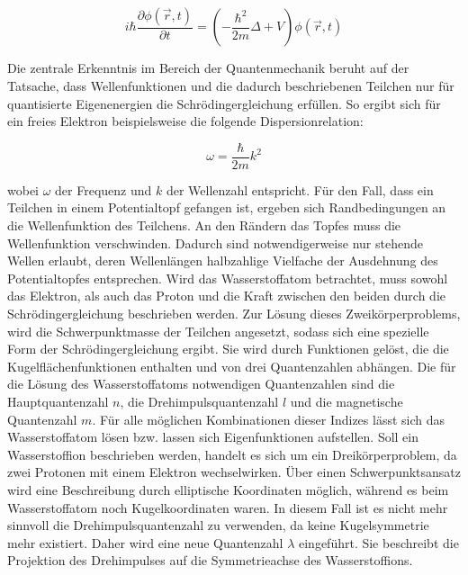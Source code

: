 \begin{equation}
    i \hbar \frac{\partial \phi(\vec{r},t)}{\partial t} = ( - \frac{\hbar^2}{2m} \Delta + V) \phi(\vec{r},t)
    \label{schroed}
\end{equation}

Die zentrale Erkenntnis im Bereich der Quantenmechanik beruht 
auf  der Tatsache, dass Wellenfunktionen und die dadurch beschriebenen Teilchen nur für 
quantisierte Eigenenergien die Schrödingergleichung erfüllen.
So ergibt sich für ein freies Elektron beispielsweise die folgende Dispersionrelation:

\begin{equation}
    \omega = \frac{\hbar}{2m}k^2
    \label{dispel}
\end{equation}

wobei $\omega$ der Frequenz und $k$ der Wellenzahl entspricht.
Für den Fall, dass ein Teilchen in einem Potentialtopf gefangen ist, ergeben sich
Randbedingungen an die Wellenfunktion des Teilchens. An den Rändern das Topfes muss die 
Wellenfunktion verschwinden. Dadurch sind notwendigerweise nur stehende Wellen erlaubt, 
deren Wellenlängen halbzahlige Vielfache der Ausdehnung des Potentialtopfes entsprechen.
Wird das Wasserstoffatom betrachtet, muss sowohl das Elektron, als auch das Proton 
und die Kraft zwischen den beiden durch die Schrödingergleichung beschrieben werden.
Zur Lösung dieses Zweikörperproblems, wird die Schwerpunktmasse der Teilchen angesetzt, 
sodass sich eine spezielle Form der Schrödingergleichung ergibt. Sie wird durch Funktionen 
gelöst, die die Kugelflächenfunktionen enthalten und von drei Quantenzahlen abhängen.
Die für die Lösung des Wasserstoffatoms notwendigen Quantenzahlen sind die Hauptquantenzahl $n$,
die Drehimpulsquantenzahl $l$ und die magnetische Quantenzahl $m$. Für alle möglichen Kombinationen dieser
Indizes lässt sich das Wasserstoffatom lösen bzw. lassen sich Eigenfunktionen aufstellen.
Soll ein Wasserstoffion beschrieben werden, handelt es sich um ein Dreikörperproblem,
da zwei Protonen mit einem Elektron wechselwirken. Über einen Schwerpunktsansatz wird
eine Beschreibung durch elliptische Koordinaten möglich, während es beim Wasserstoffatom noch 
Kugelkoordinaten waren. In diesem Fall ist es nicht mehr sinnvoll die 
Drehimpulsquantenzahl zu verwenden, da keine Kugelsymmetrie mehr existiert.
Daher wird eine neue Quantenzahl $\lambda$ eingeführt. Sie beschreibt die Projektion 
des Drehimpulses auf die Symmetrieachse des Wasserstoffions.

